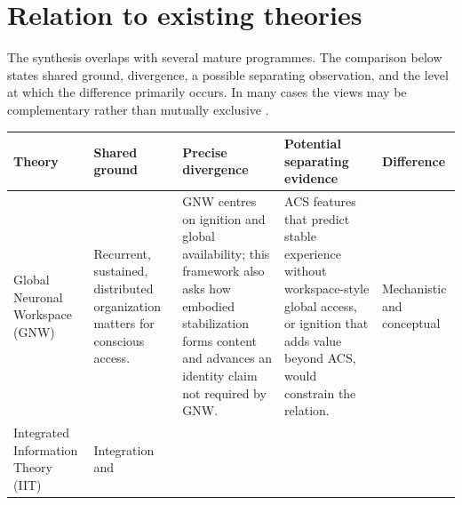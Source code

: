 \documentclass[
  11pt,
  a4paper,
]{article}
\newcounter{none} %
\begin{document}
\section{Relation to existing
theories}\label{relation-to-existing-theories}

The synthesis overlaps with several mature programmes. The comparison
below states shared ground, divergence, a possible separating
observation, and the level at which the difference primarily occurs. In
many cases the views may be complementary rather than mutually exclusive
\citep{sethbayne2022}.

{\def\LTcaptype{none} %
\begin{longtable}[]{@{}
  >{\raggedright\arraybackslash}p{}
  >{\raggedright\arraybackslash}p{}
  >{\raggedright\arraybackslash}p{}
  >{\raggedright\arraybackslash}p{}
  >{\raggedright\arraybackslash}p{}@{}}
\toprule\noalign{}
\begin{minipage}[b]{\linewidth}\raggedright
Theory
\end{minipage} & \begin{minipage}[b]{\linewidth}\raggedright
Shared ground
\end{minipage} & \begin{minipage}[b]{\linewidth}\raggedright
Precise divergence
\end{minipage} & \begin{minipage}[b]{\linewidth}\raggedright
Potential separating evidence
\end{minipage} & \begin{minipage}[b]{\linewidth}\raggedright
Difference
\end{minipage} \\
\midrule\noalign{}
\endhead
\bottomrule\noalign{}
\endlastfoot
Global Neuronal Workspace (GNW)
\citep{baars1988, dehaene2001, mashour2020} & Recurrent, sustained,
distributed organization matters for conscious access. & GNW centres on
ignition and global availability; this framework also asks how embodied
stabilization forms content and advances an identity claim not required
by GNW. & ACS features that predict stable experience without
workspace-style global access, or ignition that adds value beyond ACS,
would constrain the relation. & Mechanistic and conceptual \\
Integrated Information Theory (IIT) \citep{tononi2016} & Integration and

\end{longtable}}
\end{document}
